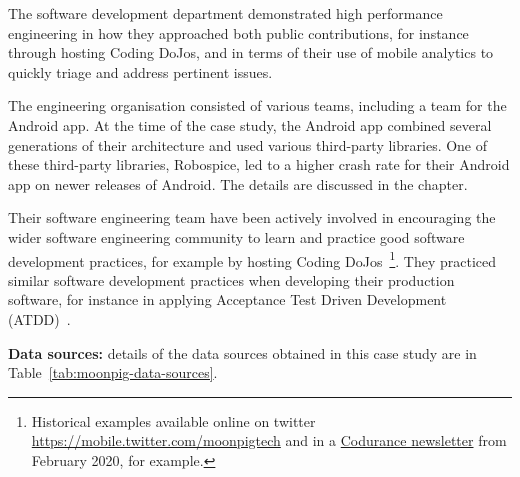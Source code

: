 The software development department demonstrated high performance engineering in how they approached both public contributions, for instance through hosting Coding DoJos, and in terms of their use of mobile analytics to quickly triage and address pertinent issues.

The engineering organisation consisted of various teams, including a team for the Android app. At the time of the case study, the Android app combined several generations of their architecture and used various third-party libraries. One of these third-party libraries, Robospice, led to a higher crash rate for their Android app on newer releases of Android. The details are discussed in the  chapter.

Their software engineering team have been actively involved in encouraging the wider software engineering community to learn and practice good software development practices, for example by hosting Coding DoJos~\footnote{Historical examples available online on twitter \url{https://mobile.twitter.com/moonpigtech} and in a \href{https://www.codurance.com/publications/newsletters/2020-02-13-newsletter}{Codurance newsletter} from February 2020, for example.}. They practiced similar software development practices when developing their production software, for instance in applying Acceptance Test Driven Development (ATDD)~.

\textbf{Data sources:}  details of the data sources obtained in this case study are in Table~\ref{tab:moonpig-data-sources}.

